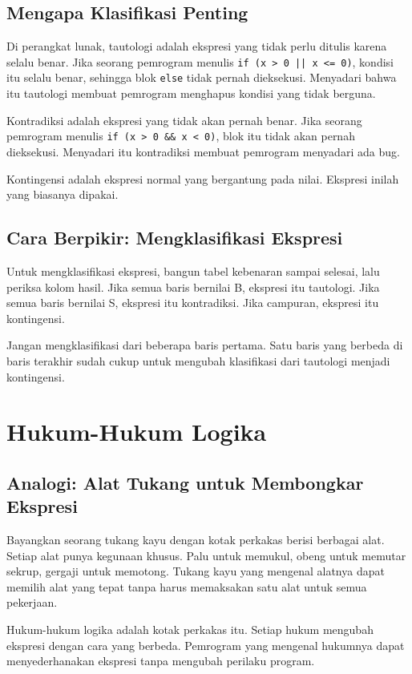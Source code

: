 \documentclass[11pt,a4paper]{article}
\begin{document}
\subsection{Mengapa Klasifikasi Penting}

Di perangkat lunak, tautologi adalah ekspresi yang tidak perlu ditulis karena selalu benar. Jika seorang pemrogram menulis \texttt{if (x > 0 || x <= 0)}, kondisi itu selalu benar, sehingga blok \texttt{else} tidak pernah dieksekusi. Menyadari bahwa itu tautologi membuat pemrogram menghapus kondisi yang tidak berguna.

Kontradiksi adalah ekspresi yang tidak akan pernah benar. Jika seorang pemrogram menulis \texttt{if (x > 0 \&\& x < 0)}, blok itu tidak akan pernah dieksekusi. Menyadari itu kontradiksi membuat pemrogram menyadari ada bug.

Kontingensi adalah ekspresi normal yang bergantung pada nilai. Ekspresi inilah yang biasanya dipakai.

\subsection{Cara Berpikir: Mengklasifikasi Ekspresi}

Untuk mengklasifikasi ekspresi, bangun tabel kebenaran sampai selesai, lalu periksa kolom hasil. Jika semua baris bernilai B, ekspresi itu tautologi. Jika semua baris bernilai S, ekspresi itu kontradiksi. Jika campuran, ekspresi itu kontingensi.

Jangan mengklasifikasi dari beberapa baris pertama. Satu baris yang berbeda di baris terakhir sudah cukup untuk mengubah klasifikasi dari tautologi menjadi kontingensi.

\section{Hukum-Hukum Logika}

\subsection{Analogi: Alat Tukang untuk Membongkar Ekspresi}

Bayangkan seorang tukang kayu dengan kotak perkakas berisi berbagai alat. Setiap alat punya kegunaan khusus. Palu untuk memukul, obeng untuk memutar sekrup, gergaji untuk memotong. Tukang kayu yang mengenal alatnya dapat memilih alat yang tepat tanpa harus memaksakan satu alat untuk semua pekerjaan.

Hukum-hukum logika adalah kotak perkakas itu. Setiap hukum mengubah ekspresi dengan cara yang berbeda. Pemrogram yang mengenal hukumnya dapat menyederhanakan ekspresi tanpa mengubah perilaku program.
\end{document}
